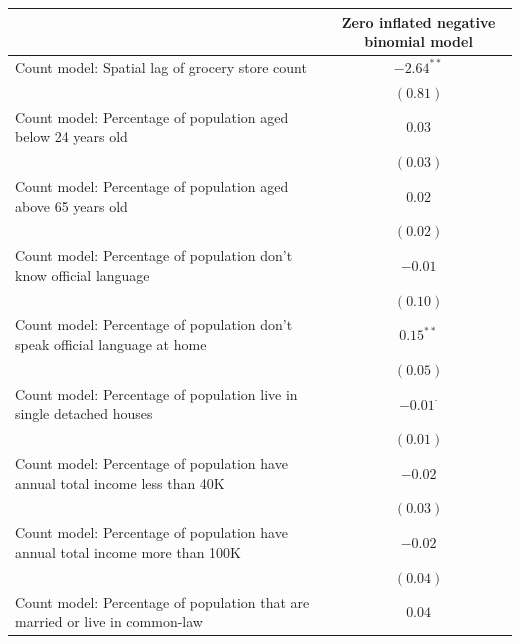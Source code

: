 \documentclass[preprint, 3p,
authoryear]{elsarticle} %
\begin{document}
\begin{table}
\begin{center}
\begin{footnotesize}
\begin{tabular}{l c}
\hline
 & Zero inflated negative binomial model \\
\hline
Count model: Spatial lag of grocery store count                               & $-2.64^{**}$    \\
                                                                              & $(0.81)$        \\
Count model: Percentage of population aged below 24 years old                 & $0.03$          \\
                                                                              & $(0.03)$        \\
Count model: Percentage of population aged above 65 years old                 & $0.02$          \\
                                                                              & $(0.02)$        \\
Count model: Percentage of population don't know official language            & $-0.01$         \\
                                                                              & $(0.10)$        \\
Count model: Percentage of population don't speak official language at home   & $0.15^{**}$     \\
                                                                              & $(0.05)$        \\
Count model: Percentage of population live in single detached houses          & $-0.01^{\cdot}$ \\
                                                                              & $(0.01)$        \\
Count model: Percentage of population have annual total income less than 40K  & $-0.02$         \\
                                                                              & $(0.03)$        \\
Count model: Percentage of population have annual total income more than 100K & $-0.02$         \\
                                                                              & $(0.04)$        \\
Count model: Percentage of population that are married or live in common-law  & $0.04$          \\

\end{tabular}
\end{footnotesize}
\end{center}
\end{table}
\end{document}
